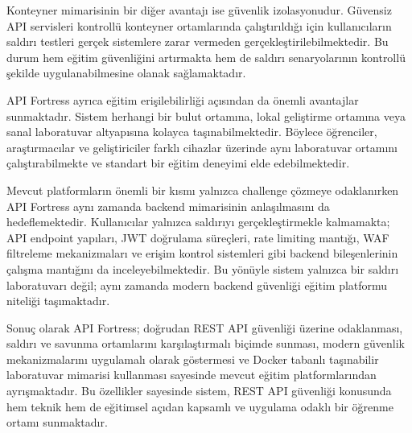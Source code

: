 Konteyner mimarisinin bir diğer avantajı ise güvenlik izolasyonudur. Güvensiz API servisleri kontrollü konteyner ortamlarında çalıştırıldığı için kullanıcıların saldırı testleri gerçek sistemlere zarar vermeden gerçekleştirilebilmektedir. Bu durum hem eğitim güvenliğini artırmakta hem de saldırı senaryolarının kontrollü şekilde uygulanabilmesine olanak sağlamaktadır.

API Fortress ayrıca eğitim erişilebilirliği açısından da önemli avantajlar sunmaktadır. Sistem herhangi bir bulut ortamına, lokal geliştirme ortamına veya sanal laboratuvar altyapısına kolayca taşınabilmektedir. Böylece öğrenciler, araştırmacılar ve geliştiriciler farklı cihazlar üzerinde aynı laboratuvar ortamını çalıştırabilmekte ve standart bir eğitim deneyimi elde edebilmektedir.

Mevcut platformların önemli bir kısmı yalnızca challenge çözmeye odaklanırken API Fortress aynı zamanda backend mimarisinin anlaşılmasını da hedeflemektedir. Kullanıcılar yalnızca saldırıyı gerçekleştirmekle kalmamakta; API endpoint yapıları, JWT doğrulama süreçleri, rate limiting mantığı, WAF filtreleme mekanizmaları ve erişim kontrol sistemleri gibi backend bileşenlerinin çalışma mantığını da inceleyebilmektedir. Bu yönüyle sistem yalnızca bir saldırı laboratuvarı değil; aynı zamanda modern backend güvenliği eğitim platformu niteliği taşımaktadır.

Sonuç olarak API Fortress; doğrudan REST API güvenliği üzerine odaklanması, saldırı ve savunma ortamlarını karşılaştırmalı biçimde sunması, modern güvenlik mekanizmalarını uygulamalı olarak göstermesi ve Docker tabanlı taşınabilir laboratuvar mimarisi kullanması sayesinde mevcut eğitim platformlarından ayrışmaktadır. Bu özellikler sayesinde sistem, REST API güvenliği konusunda hem teknik hem de eğitimsel açıdan kapsamlı ve uygulama odaklı bir öğrenme ortamı sunmaktadır.


\clearpage
